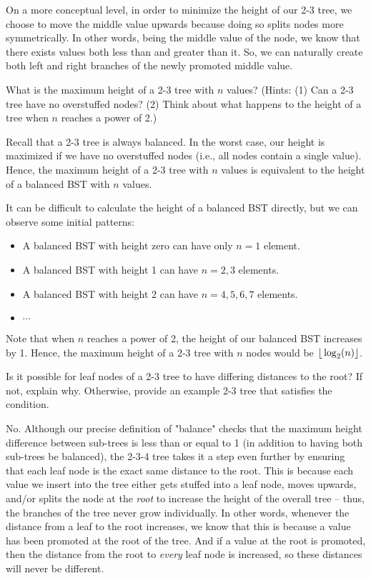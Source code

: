 \begin{parts}
\begin{solution}[2in]
On a more conceptual level, in order to minimize the height of our 2-3 tree, we choose to move the middle value upwards because doing so splits nodes more symmetrically. In other words, being the middle value of the node, we know that there exists values both less than and greater than it. So, we can naturally create both left and right branches of the newly promoted middle value.
\end{solution}

\item What is the maximum height of a 2-3 tree with $n$ values? (Hints: 
(1) Can a 2-3 tree have no overstuffed nodes? (2) Think about
what happens to the height of a tree when $n$ reaches a power of 2.)

\begin{solution}[2in]
Recall that a 2-3 tree is always balanced. In the worst case, our height is maximized if we have no overstuffed nodes (i.e., all nodes contain a single value). 
Hence, the maximum height of a 2-3 tree with $n$ values is equivalent to the height of a balanced BST with $n$ values.

It can be difficult to calculate the height of a balanced BST directly, but we can observe some initial patterns:
\begin{itemize}
    \item A balanced BST with height zero can have only $n=1$ element.
    \item A balanced BST with height 1 can have $n=2, 3$ elements.
    \item A balanced BST with height 2 can have $n=4, 5, 6, 7$ elements.
    \item $\cdots$
\end{itemize}
Note that when $n$ reaches a power of 2, the height of our balanced BST increases by 1. Hence, the maximum height of a 2-3 tree with $n$ nodes would be $\lfloor{} \log_2(n) \rfloor{}$.
\end{solution}

\item Is it possible for leaf nodes of a 2-3 tree to have differing distances to the root? If not, explain why. Otherwise, provide an example 2-3 tree that satisfies the condition.

\begin{solution}%
No. Although our precise definition of "balance" checks that the maximum height difference between sub-trees is less than or equal to 1 (in addition to having both sub-trees be balanced), the 2-3-4 tree takes it a step even further by ensuring that each leaf node is the exact same distance to the root. This is because each value we insert into the tree either gets stuffed into a leaf node, moves upwards, and/or splits the node at the \textit{root} to increase the height of the overall tree -- thus, the branches of the tree never grow individually. In other words, whenever the distance from a leaf to the root increases, we know that this is because a value has been promoted at the root of the tree. And if a value at the root is promoted, then the distance from the root to \textit{every} leaf node is increased, so these distances will never be different.


\end{solution}
\end{parts}
